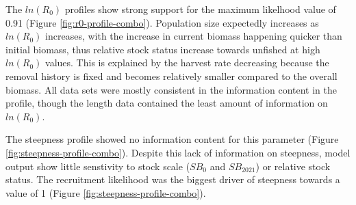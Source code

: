 \documentclass[11pt,
  english,
  a4paper,
]{article}
\begin{document}
The {\(ln(R_0)\)\leavevmode\tagmcend\tagstructend} profiles show strong support for the maximum likelhood value of 0.91 (Figure \ref{fig:r0-profile-combo}). Population size expectedly increases as {\(ln(R_0)\)\leavevmode\tagmcend\tagstructend} increases, with the increase in current biomass happening quicker than initial biomass, thus relative stock status increase towards unfished at high {\(ln(R_0)\)\leavevmode\tagmcend\tagstructend} values. This is explained by the harvest rate decreasing because the removal history is fixed and becomes relatively smaller compared to the overall biomass. All data sets were mostly consistent in the information content in the profile, though the length data contained the least amount of information on {\(ln(R_0)\)\leavevmode\tagmcend\tagstructend}.

\leavevmode\tagmcend\tagstructend\par


The steepness profile showed no information content for this parameter (Figure \ref{fig:steepness-profile-combo}). Despite this lack of information on steepness, model output show little senstivity to stock scale ({\(SB_0\)\leavevmode\tagmcend\tagstructend} and {\(SB_2021\)\leavevmode\tagmcend\tagstructend}) or relative stock status. The recruitment likelihood was the biggest driver of steepness towards a value of 1 (Figure \ref{fig:steepness-profile-combo}).

\leavevmode\tagmcend\tagstructend\par

\end{document}
